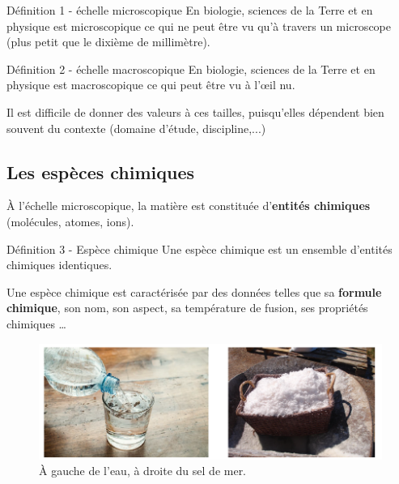 \documentclass[french, a4paper, 12pt, twocolumn, landscape]{article}
\begin{document}
\begin{definition}{Définition 1 - échelle microscopique}
	En biologie, sciences de la Terre et en physique est microscopique ce qui ne peut être vu qu'à travers un microscope (plus petit que le dixième de millimètre).
\end{definition}


\begin{definition}{Définition 2 - échelle macroscopique}
	En biologie, sciences de la Terre et en physique est macroscopique ce qui peut être vu à l'\oe il nu.
\end{definition}\bigskip

Il est difficile de donner des valeurs à ces tailles, puisqu'elles dépendent bien souvent du contexte (domaine d'étude, discipline,...)

\subsection{Les espèces chimiques}

À l'échelle microscopique, la matière est constituée d'\textbf{entités chimiques} (molécules, atomes, ions).\medskip


\begin{definition}{Définition 3 - Espèce chimique}
Une espèce chimique est un ensemble d'entités chimiques identiques.
\end{definition}

Une espèce chimique est caractérisée par des données telles que sa \textbf{formule chimique}, son nom, son aspect, sa température de fusion, ses propriétés chimiques \dots

\begin{figure}[ht]
	\centering
	\includegraphics[width=.5\textwidth]{sel.png}
	\caption{À gauche de l'eau, à droite du sel de mer.}
\end{figure}

\end{document}

